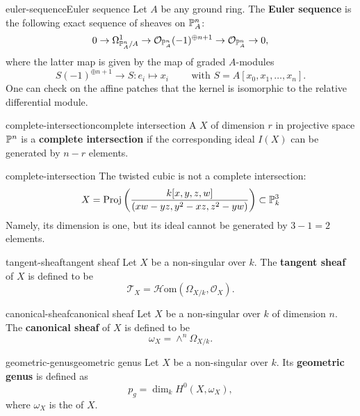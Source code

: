 \begin{topic}{euler-sequence}{Euler sequence}
    Let $A$ be any ground ring. The \textbf{Euler sequence} is the following exact sequence of sheaves on $\mathbb{P}_A^n$:
    \[ 0 \rightarrow \Omega^1_{\mathbb{P}^n_A/A} \rightarrow \mathcal{O}_{\mathbb{P}_A^n}(-1)^{\oplus n + 1} \rightarrow \mathcal{O}_{\mathbb{P}_A^n} \rightarrow 0 , \]
    where the latter map is given by the map of graded $A$-modules
    \[ S(-1)^{\oplus n + 1} \to S : e_i \mapsto x_i \qquad \text{ with } S = A[x_0, x_1, \ldots, x_n] . \]
    One can check on the affine patches that the kernel is isomorphic to the relative differential module.
\end{topic}

\begin{topic}{complete-intersection}{complete intersection}
    A  $X$ of dimension $r$ in projective space $\mathbb{P}^n$ is a \textbf{complete intersection} if the corresponding ideal $I(X)$ can be generated by $n - r$ elements.
\end{topic}

\begin{example}{complete-intersection}
    The twisted cubic is not a complete intersection:
    \[ X = \text{Proj}\left(\frac{k[x, y, z, w]}{(xw - yz, y^2 - xz, z^2 - yw)}\right) \subset \mathbb{P}_k^3 \]
    Namely, its dimension is one, but its ideal cannot be generated by $3 - 1 = 2$ elements.
\end{example}

\begin{topic}{tangent-sheaf}{tangent sheaf}
    Let $X$ be a non-singular  over $k$. The \textbf{tangent sheaf} of $X$ is defined to be
    \[ \mathcal{T}_X = \mathcal{H}\text{om}(\Omega_{X/k}, \mathcal{O}_X) . \]
\end{topic}

\begin{topic}{canonical-sheaf}{canonical sheaf}
    Let $X$ be a non-singular  over $k$ of dimension $n$. The \textbf{canonical sheaf} of $X$ is defined to be
    \[ \omega_X = \wedge^n \Omega_{X/k} . \]
\end{topic}

\begin{topic}{geometric-genus}{geometric genus}
    Let $X$ be a non-singular  over $k$. Its \textbf{geometric genus} is defined as
    \[ p_g = \dim_k H^0(X, \omega_X) , \]
    where $\omega_X$ is the  of $X$.
\end{topic}

